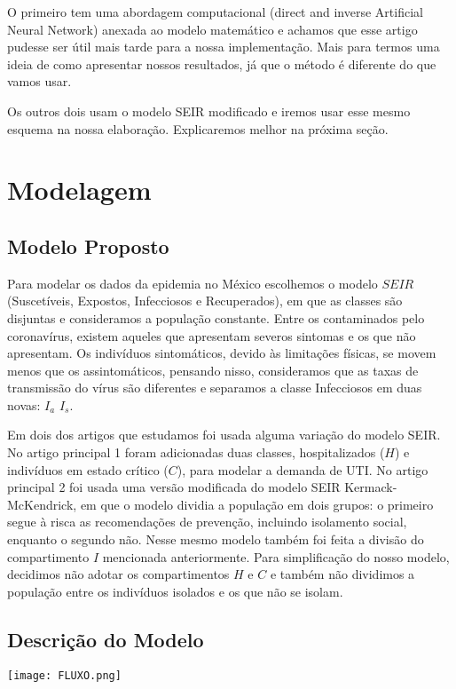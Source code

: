 \documentclass{article}
\begin{document}
O primeiro tem uma abordagem computacional (direct and inverse Artificial Neural Network) anexada ao modelo matemático e achamos que esse artigo pudesse ser útil mais tarde para a nossa implementação. Mais para termos uma ideia de como apresentar nossos resultados, já que o método é diferente do que vamos usar.

Os outros dois usam o modelo SEIR modificado e iremos usar esse mesmo esquema na nossa elaboração. Explicaremos melhor na próxima seção. 

\section{Modelagem}
\subsection{Modelo Proposto}
Para modelar os dados da epidemia no México escolhemos o modelo $SEIR$ (Suscetíveis, Expostos, Infecciosos e Recuperados), em que as classes são disjuntas e consideramos a população constante. Entre os contaminados pelo coronavírus, existem aqueles que apresentam severos sintomas e os que não apresentam. Os indivíduos sintomáticos, devido às limitações físicas, se movem menos que os assintomáticos, pensando nisso, consideramos que as taxas de transmissão do vírus são diferentes e separamos a classe Infecciosos em duas novas: $I_a$  $I_s$.

Em dois dos artigos que estudamos foi usada alguma variação do modelo SEIR. No artigo principal 1 foram adicionadas duas classes, hospitalizados ($H$) e indivíduos em estado crítico ($C$), para modelar a demanda de UTI.
No artigo principal 2 foi usada uma versão modificada do modelo SEIR Kermack-McKendrick, em que o modelo dividia a população em dois grupos: o primeiro segue à risca as recomendações de prevenção, incluindo isolamento social, enquanto o segundo não. Nesse mesmo modelo também foi feita a divisão do  compartimento $I$ mencionada anteriormente. Para simplificação do nosso modelo, decidimos não adotar os compartimentos $H$ e $C$ e também não dividimos a população entre os indivíduos isolados e os que não se isolam.

\subsection{Descrição do Modelo}

\texttt{[image: FLUXO.png]}
\end{document}

